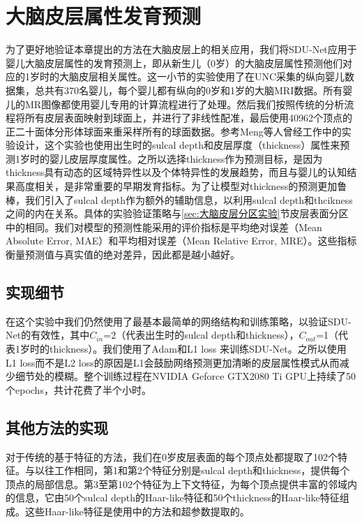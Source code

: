 
\section{大脑皮层属性发育预测}\label{sec:大脑皮层属性发育预测}
为了更好地验证本章提出的方法在大脑皮层上的相关应用，我们将SDU-Net应用于婴儿大脑皮层属性的发育预测上，即从新生儿（0岁）的大脑皮层属性预测他们对应的1岁时的大脑皮层相关属性。这一小节的实验使用了在UNC采集的纵向婴儿数据集，总共有370名婴儿，每个婴儿都有纵向的0岁和1岁的大脑MRI数据。所有婴儿的MR图像都使用婴儿专用的计算流程\cite{li2015construction}进行了处理。然后我们按照传统的分析流程将所有皮层表面映射到球面上，并进行了非线性配准，最后使用40962个顶点的正二十面体分形体球面来重采样所有的球面数据。参考Meng等人\cite{meng2017can}曾经工作中的实验设计，这个实验也使用出生时的sulcal depth和皮层厚度（thickness）属性来预测1岁时的婴儿皮层厚度属性。之所以选择thickness作为预测目标，是因为thickness具有动态的区域特异性以及个体特异性的发展趋势，而且与婴儿的认知结果高度相关\cite{gilmore2018imaging}，是非常重要的早期发育指标。为了让模型对thickness的预测更加鲁棒，我们引入了sulcal depth作为额外的辅助信息，以利用sulcal depth和thcikness之间的内在关系\cite{li2015spatial}。具体的实验验证策略与\ref{sec:大脑皮层分区实验}节皮层表面分区中的相同。我们对模型的预测性能采用的评价指标是平均绝对误差（Mean Absolute Error, MAE）和平均相对误差（Mean Relative Error, MRE）。这些指标衡量预测值与真实值的绝对差异，因此都是越小越好。

\subsection{实现细节}
在这个实验中我们仍然使用了最基本最简单的网络结构和训练策略，以验证SDU-Net的有效性，其中$C_{in}$=2（代表出生时的sulcal depth和thickness），$C_{out}$=1（代表1岁时的thickness）。我们使用了Adam和L1 loss 来训练SDU-Net。之所以使用L1 loss而不是L2 loss的原因是L1会鼓励网络预测更加清晰的皮层属性模式从而减少细节处的模糊\cite{isola2017image}。整个训练过程在NVIDIA Geforce GTX2080 Ti GPU上持续了50个epochs，共计花费了半个小时。

\subsection{其他方法的实现}
对于传统的基于特征的方法，我们在0岁皮层表面的每个顶点处都提取了102个特征。与以往工作\cite{meng2017can}相同，第1和第2个特征分别是sulcal depth和thickness，提供每个顶点的局部信息。第3至第102个特征为上下文特征，为每个顶点提供丰富的邻域内的信息，它由50个sulcal depth的Haar-like特征和50个thickness的Haar-like特征组成。这些Haar-like特征是使用\cite{meng2017can}中的方法和超参数提取的。


